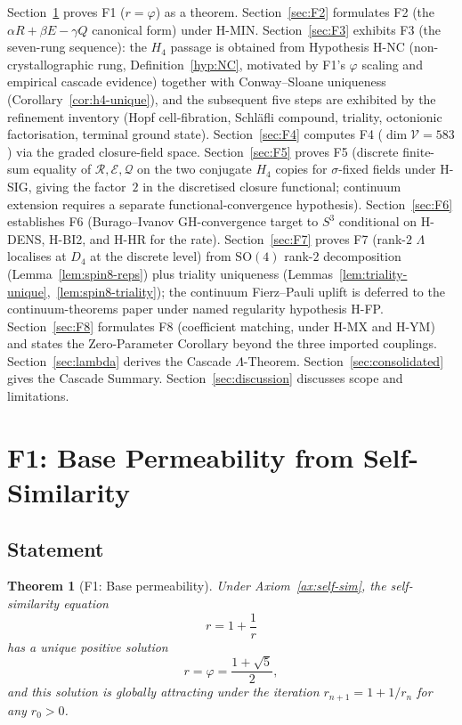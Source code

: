 \documentclass[12pt]{article}
\newtheorem{theorem}{Theorem}
\theoremstyle{definition}
\theoremstyle{remark}
\newcommand{\Vcal}{\mathcal{V}}
\begin{document}
Section~\ref{sec:F1} proves F1 ($r = \varphi$) as a theorem. Section~\ref{sec:F2} formulates F2 (the $\alpha R + \beta E - \gamma Q$ canonical form) under H-MIN. Section~\ref{sec:F3} exhibits F3 (the seven-rung sequence): the $H_4$ passage is obtained from Hypothesis H-NC (non-crystallographic rung, Definition~\ref{hyp:NC}, motivated by F1's $\varphi$ scaling and empirical cascade evidence) together with Conway--Sloane uniqueness (Corollary~\ref{cor:h4-unique}), and the subsequent five steps are exhibited by the refinement inventory (Hopf cell-fibration, Schl\"afli compound, triality, octonionic factorisation, terminal ground state). Section~\ref{sec:F4} computes F4 ($\dim \Vcal = 583$) via the graded closure-field space. Section~\ref{sec:F5} proves F5 (discrete finite-sum equality of $\mathcal R, \mathcal E, \mathcal Q$ on the two conjugate $H_4$ copies for $\sigma$-fixed fields under H-SIG, giving the factor~$2$ in the discretised closure functional; continuum extension requires a separate functional-convergence hypothesis). Section~\ref{sec:F6} establishes F6 (Burago--Ivanov GH-convergence target to $S^3$ conditional on H-DENS, H-BI2, and H-HR for the rate). Section~\ref{sec:F7} proves F7 (rank-$2$ $\Lambda$ localises at $D_4$ at the discrete level) from $\mathrm{SO}(4)$ rank-$2$ decomposition (Lemma~\ref{lem:spin8-reps}) plus triality uniqueness (Lemmas~\ref{lem:triality-unique},~\ref{lem:spin8-triality}); the continuum Fierz--Pauli uplift is deferred to the continuum-theorems paper under named regularity hypothesis H-FP. Section~\ref{sec:F8} formulates F8 (coefficient matching, under H-MX and H-YM) and states the Zero-Parameter Corollary beyond the three imported couplings. Section~\ref{sec:lambda} derives the Cascade $\Lambda$-Theorem. Section~\ref{sec:consolidated} gives the Cascade Summary. Section~\ref{sec:discussion} discusses scope and limitations.

\section{F1: Base Permeability from Self-Similarity}\label{sec:F1}

\subsection{Statement}

\begin{theorem}[F1: Base permeability]\label{thm:F1}
Under Axiom~\ref{ax:self-sim}, the self-similarity equation
\begin{equation}\label{eq:dagger}
r = 1 + \frac{1}{r}
\end{equation}
has a unique positive solution
\begin{equation}
r = \varphi = \frac{1 + \sqrt{5}}{2},
\end{equation}
and this solution is globally attracting under the iteration $r_{n+1} = 1 + 1/r_n$ for any $r_0 > 0$.
\end{theorem}
\end{document}
